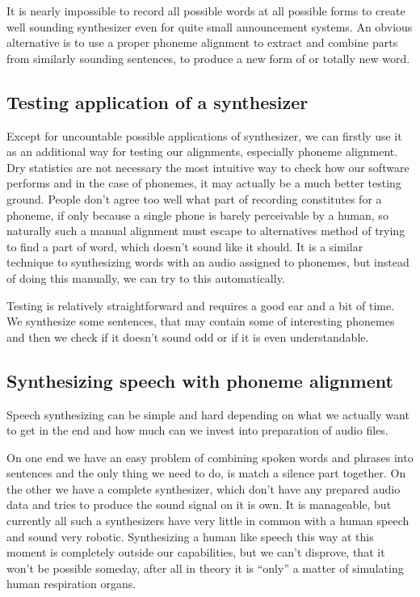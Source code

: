 \documentclass[12pt,a4paper,english]{article}
\begin{document}
It is nearly impossible to record all possible words at all possible forms to create well sounding synthesizer even for quite small announcement systems. An obvious alternative is to use a proper phoneme alignment to extract and combine parts from similarly sounding sentences, to produce a new form of or totally new word. \newline \newline

\subsection{Testing application of a synthesizer}

Except for uncountable possible applications of synthesizer, we can firstly use it as an additional way for testing our alignments, especially phoneme alignment. Dry statistics are not necessary the most intuitive way to check how our software performs and in the case of phonemes, it may actually be a much better testing ground. People don't agree too well what part of recording constitutes for a phoneme, if only because a single phone is barely perceivable by a human, so naturally such a manual alignment must escape to alternatives method of trying to find a part of word, which doesn't sound like it should. \newline
It is a similar technique to synthesizing words with an audio assigned to phonemes, but instead of doing this manually, we can try to this automatically. \newline

Testing is relatively straightforward and requires a good ear and a bit of time. We synthesize some sentences, that may contain some of interesting phonemes and then we check if it doesn't sound odd or if it is even understandable. 

\newpage
\subsection{Synthesizing speech with phoneme alignment}
Speech synthesizing can be simple and hard depending on what we actually want to get in the end and how much can we invest into preparation of audio files. \newline

On one end we have an easy problem of combining spoken words and phrases into sentences and the only thing we need to do, is match a silence part together. \newline
On the other we have a complete synthesizer, which don't have any prepared audio data and tries to produce the sound signal on it is own. It is manageable, but currently all such a synthesizers have very little in common with a human speech and sound very robotic. Synthesizing a human like speech this way at this moment is completely outside our capabilities, but we can't disprove, that it won't be possible someday, after all in theory it is “only” a matter of simulating human respiration organs. \newline
\end{document}

